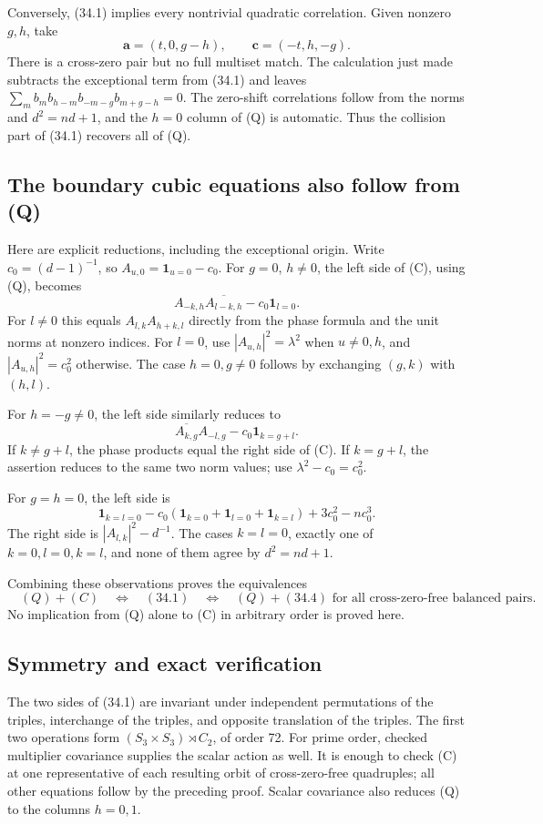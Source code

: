 \documentclass[11pt,reqno]{amsart}
\theoremstyle{plain}
\begin{document}
Conversely, (34.1) implies every nontrivial quadratic correlation.
Given nonzero \(g,h\), take
\[
 \mathbf a=(t,0,g-h),\qquad \mathbf c=(-t,h,-g).
\]
There is a cross-zero pair but no full multiset match. The calculation
just made subtracts the exceptional term from (34.1) and leaves
\(\sum_m b_m b_{h-m}b_{-m-g}b_{m+g-h}=0\).
The zero-shift correlations follow from the norms and
\(d^2=nd+1\), and the \(h=0\) column of (Q) is automatic.
Thus the collision part of (34.1) recovers all of (Q).

\subsection{The boundary cubic equations also follow from (Q)}\label{sec:34.3}

Here are explicit reductions, including the exceptional origin.
Write \(c_0=(d-1)^{-1}\), so \(A_{u,0}=\mathbf1_{u=0}-c_0\).
For \(g=0\), \(h\ne0\), the left side of (C), using (Q), becomes
\[
 A_{-k,h}\overline{A_{l-k,h}}-c_0\mathbf1_{l=0}.
\]
For \(l\ne0\) this equals \(A_{l,k}A_{h+k,l}\) directly from
the phase formula and the unit norms at nonzero indices. For \(l=0\),
use \(|A_{u,h}|^2=\lambda^2\) when \(u\ne0,h\), and
\(|A_{u,h}|^2=c_0^2\) otherwise. The case \(h=0,g\ne0\)
follows by exchanging \((g,k)\) with \((h,l)\).

For \(h=-g\ne0\), the left side similarly reduces to
\[
 \overline{A_{k,g}}A_{-l,g}-c_0\mathbf1_{k=g+l}.
\]
If \(k\ne g+l\), the phase products equal the right side of (C).
If \(k=g+l\), the assertion reduces to the same two norm values;
use \(\lambda^2-c_0=c_0^2\).

For \(g=h=0\), the left side is
\[
 \mathbf1_{k=l=0}
 -c_0(\mathbf1_{k=0}+\mathbf1_{l=0}+\mathbf1_{k=l})
 +3c_0^2-nc_0^3.
\]
The right side is \(|A_{l,k}|^2-d^{-1}\). The cases
\(k=l=0\), exactly one of \(k=0,l=0,k=l\), and none of them
agree by \(d^2=nd+1\).

Combining these observations proves the equivalences
\[
 \boxed{\quad
 (Q)+(C)\quad\Longleftrightarrow\quad(34.1)
 \quad\Longleftrightarrow\quad(Q)+(34.4)
 \text{ for all cross-zero-free balanced pairs}.\quad}
\]
No implication from (Q) alone to (C) in arbitrary order is proved here.

\subsection{Symmetry and exact verification}\label{sec:34.4}

The two sides of (34.1) are invariant under independent permutations
of the triples, interchange of the triples, and opposite translation
of the triples. The first two operations form
\((S_3\times S_3)\rtimes C_2\), of order 72. For prime order,
checked multiplier covariance supplies the scalar action as well.
It is enough to check (C) at one representative of each resulting
orbit of cross-zero-free quadruples; all other equations follow by
the preceding proof. Scalar covariance also reduces (Q) to the
columns \(h=0,1\).
\end{document}
